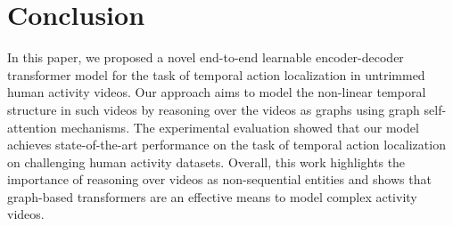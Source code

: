 \documentclass[10pt,twocolumn,letterpaper]{article}
\begin{document}
\section{Conclusion}
In this paper, we proposed a novel end-to-end learnable encoder-decoder transformer model for the task of temporal action localization in untrimmed human activity videos. Our approach aims to model the non-linear temporal structure in such videos by reasoning over the videos as graphs using graph self-attention mechanisms. The experimental evaluation showed that our model achieves state-of-the-art performance on the task of temporal action localization on challenging human activity datasets. Overall, this work highlights the importance of reasoning over videos as non-sequential entities and shows that graph-based transformers are an effective means to model complex activity videos.
\clearpage 


{\small


}

\clearpage
\cvprappendix

\renewcommand\thesection{\Alph{section}}
\setcounter{table}{0}
\setcounter{figure}{0}
\setcounter{section}{0}
\renewcommand{\thetable}{T\arabic{table}}
\renewcommand{\thesection}{\Alph{section}}
\renewcommand{\thefigure}{F\arabic{figure}}
\end{document}

